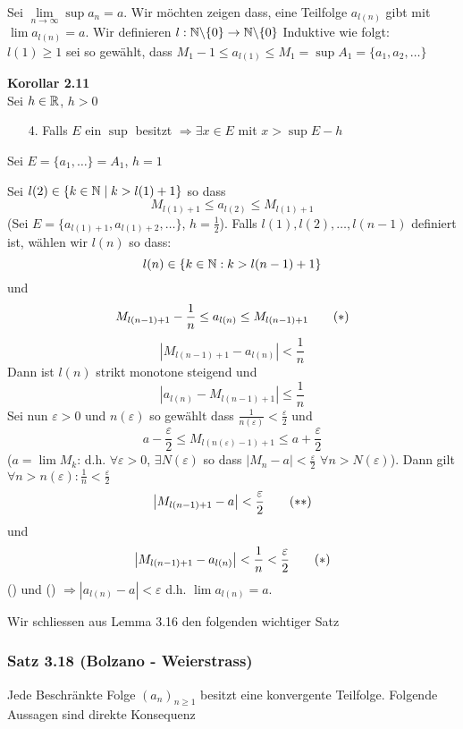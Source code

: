 \begin{beweis}{}
Sei $\mathop {\lim }\limits_{n \to \infty } \sup {a_n} = a$. Wir möchten zeigen dass, eine Teilfolge $a_{l(n)}$ gibt mit $\lim a_{l(n)}=a$. Wir definieren $l:\mathbb{N}\backslash\{ 0\}\to\mathbb{N}\backslash\{ 0\}$ Induktive wie folgt:\\

\noindent $l(1)\geq 1$ sei so gewählt, dass $M_1-1\leq a_{l(1)}\leq M_1=\sup A_1=\{ a_1,a_2,\dots\}$
\begin{framed}
\noindent\textbf{Korollar 2.11}\\
Sei $h\in\mathbb{R}$, $h>0$
\begin{enumerate}
\item[4.] Falls $E$ ein $\sup$ besitzt $\Rightarrow\exists x\in E$ mit $x>\sup E-h$ 
\end{enumerate}
Sei $E=\{ a_1,\dots\}=A_1$, $h=1$
\end{framed}
Sei $l(2)\in\{ k\in\mathbb{N}\mid k>l(1)+1\}$ so dass \[M_{l(1)+1}\leq a_{l(2)}\leq M_{l(1)+1}\]
(Sei $E=\{ a_{l(1)+1},a_{l(1)+2},\dots\}$, $h=\frac{1}{2}$). Falls $l(1),l(2),\dots,l(n-1)$ definiert ist, wählen wir $l(n)$ so dass:
\[ l(n)\in\{ k\in\mathbb{N} : k>l(n-1)+1\}\]
und 
\[
M_{l(n-1)+1}-\frac{1}{n}\leq a_{l(n)}\leq M_{l(n-1)+1}\tag{\text{\textasteriskcentered}}
\]
\[ \left| M_{l(n-1)+1}-a_{l(n)}\right| < \frac{1}{n}\]
Dann ist $l(n)$ strikt monotone steigend und 
\[ \left| a_{l(n)} -M_{l(n-1)+1}\right|\leq\frac{1}{n}\]
Sei nun $\varepsilon > 0$ und $n(\varepsilon)$ so gewählt dass $\frac{1}{n(\varepsilon)}<\frac{\varepsilon}{2}$ und 
\[a-\frac{\varepsilon}{2}\leq M_{l\left( n(\varepsilon)-1\right) +1}\leq a+\frac{\varepsilon}{2} \]
($a=\lim M_k$: d.h. $\forall\varepsilon>0$, $\exists N(\varepsilon)$ so dass $\left| M_n -a\right| < \frac{\varepsilon}{2}$ $\forall n > N(\varepsilon)$). Dann gilt $\forall n > n(\varepsilon):\frac{1}{n}<\frac{\varepsilon}{2}$
\[\left| M_{l(n-1)+1} - a\right| < \frac{\varepsilon}{2}\tag{\text{\textasteriskcentered\textasteriskcentered}}\]
und
\[\left| M_{l(n-1)+1} - a_{l(n)}\right| < \frac{1}{n}< \frac{\varepsilon}{2}\tag{\text{\textasteriskcentered}}\]
(\textasteriskcentered) und (\textasteriskcentered\textasteriskcentered) $\Rightarrow\left| a_{l(n)}-a\right| < \varepsilon$ d.h. $\lim a_{l(n)}=a.$
\end{beweis}
Wir schliessen aus Lemma 3.16 den folgenden wichtiger Satz
\subsubsection*{Satz 3.18 (Bolzano - Weierstrass)}
Jede Beschränkte Folge $\left( a_n\right)_{n\geq 1}$ besitzt eine konvergente Teilfolge.
Folgende Aussagen sind direkte Konsequenz 
